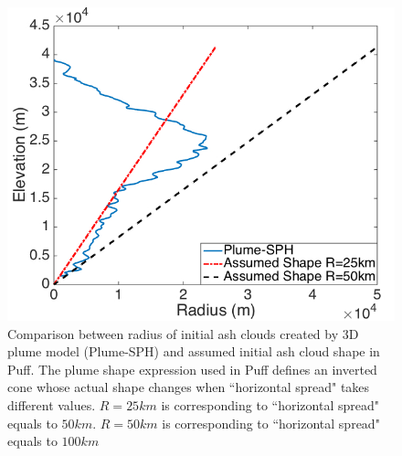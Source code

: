 \documentclass[utf8]{frontiersSCNS} %
\begin{document}
\begin{figure}[!htb]
\centering
\includegraphics[width=0.50 \textwidth]{Figures/radius-Plume-SPH-And-Assumed}
\caption{Comparison between radius of initial ash clouds created by 3D plume model (Plume-SPH) and assumed initial ash cloud shape in Puff. The plume shape expression used in Puff defines an inverted cone whose actual shape changes when ``horizontal spread" takes different values. $R=25km$ is corresponding to ``horizontal spread" equals to $50km$. $R=50km$ is corresponding to ``horizontal spread" equals to $100km$}
\label{fig:radius-comparison}
\end{figure}
\end{document}
